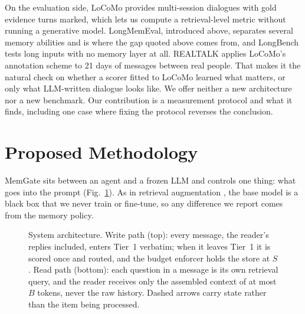 On the evaluation side, LoCoMo \cite{maharana2024locomo} provides multi-session
dialogues with gold evidence turns marked, which lets us compute a
retrieval-level metric without running a generative model. LongMemEval,
introduced above, separates several memory abilities and is where the
gap quoted above comes from, and LongBench \cite{bai2024longbench} tests long
inputs with no memory layer at all. REALTALK \cite{lee2025realtalk} applies
LoCoMo's annotation scheme to 21 days of messages between real people. That
makes it the natural check on whether a scorer fitted to LoCoMo learned what
matters, or only what LLM-written dialogue looks like. We offer neither a new
architecture nor a new benchmark. Our contribution is a measurement protocol
and what it finds, including one case where fixing the protocol reverses the
conclusion.

\section{Proposed Methodology}
\label{sec:harness}

MemGate sits between an agent and a frozen LLM and controls one thing: what
goes into the prompt (Fig.~\ref{fig:arch}). As in retrieval augmentation
\cite{lewis2020rag}, the base model is a black box that we never train or
fine-tune, so any difference we report comes from the memory policy.

\begin{figure}[t]
\centering
\resizebox{\textwidth}{!}{}
\caption{System architecture. Write path (top): every message, the reader's
replies included, enters Tier~1 verbatim; when it leaves Tier~1 it is scored
once and routed, and the budget enforcer holds the store at $S$. Read path
(bottom): each question in a message is its own retrieval query, and the
reader receives only the assembled context of at most $B$ tokens, never the
raw history. Dashed arrows carry state rather than the item being processed.}
\label{fig:arch}
\end{figure}


